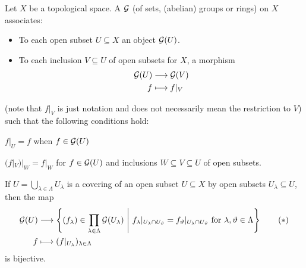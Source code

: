 \documentclass[a4paper,parskip=half,numbers=enddot, DIV=12]{scrreprt}
\begin{document}
	\begin{defi}
		Let $X$ be a topological space. A  $\mathcal{G}$ (of sets, (abelian) groups or rings) on $X$ associates:
		\begin{itemize}
			\item To each open subset $U\subseteq X$ an object $\mathcal{G}(U)$.
			\item To each inclusion $V\subseteq U$ of open subsets for $X$, a morphism
			\begin{align*}
			\mathcal{G}(U) &\longrightarrow\mathcal{G}(V)\\
			f&\longmapsto f|_V
			\end{align*}
		\end{itemize}
		(note that $f|_V$ is just notation and does not necessarily mean the restriction to $V$) such that the following conditions hold:
		\begin{alphanumerate}
			\item $f|_U = f$ when $f\in \mathcal{G}(U)$
			\item $(f|_V)|_W = f|_W$ for $f\in \mathcal{G}(U)$ and inclusions $W\subseteq V\subseteq U$ of open subsets.
			\item If $U = \bigcup_{\lambda\in\Lambda} U_\lambda$ is a covering of an open subset $U\subseteq X$ by open subsets $U_\lambda \subseteq U$, then the map
			\begin{align*}\lbl{eq:sheafGamma}
			\Gg(U) &\longto \left\{(f_\lambda)\in \prod_{\lambda\in\Lambda} \Gg (U_\lambda)\st f_\lambda|_{U_\lambda\cap U_\vartheta} = f_\vartheta|_{U_\lambda\cap U_\vartheta} \text{ for }\lambda,\vartheta\in \Lambda\right\}\tag{$*$}\\
			f &\longmapsto (f|_{U_\lambda})_{\lambda\in\Lambda}
			\end{align*}
			is bijective.
		\end{alphanumerate}
	\end{defi}
\end{document}
